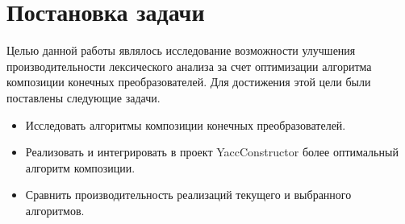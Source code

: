 \section{Постановка задачи}
Целью данной работы являлось исследование возможности улучшения производительности лексического анализа за счет оптимизации алгоритма композиции конечных преобразователей. Для достижения этой цели были поставлены следующие задачи.

\begin{itemize}
\item Исследовать алгоритмы композиции конечных преобразователей.
\item Реализовать и интегрировать в проект YaccConstructor более оптимальный алгоритм композиции.
\item Сравнить производительность реализаций текущего и выбранного алгоритмов.
\end{itemize} 

